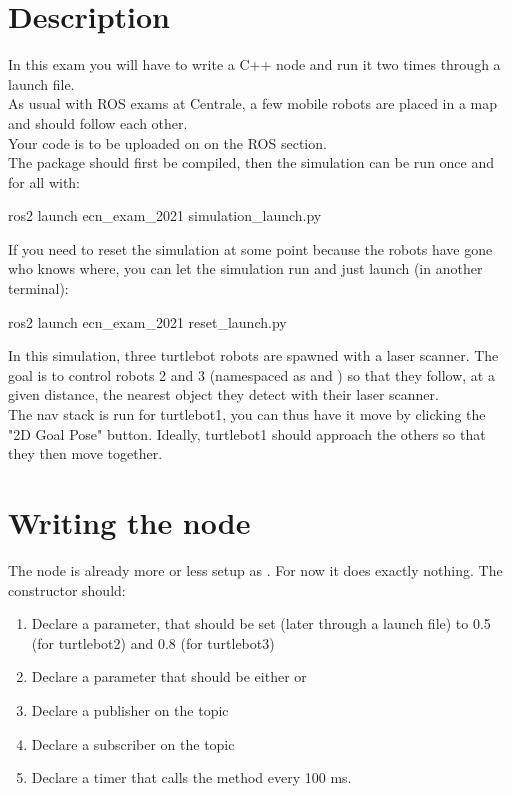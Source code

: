 \documentclass{ecnreport}
\begin{document}


\section{Description}

In this exam you will have to write a C++ node and run it two times through a launch file.\\
As usual with ROS exams at Centrale, a few mobile robots are placed in a map and should follow each other.\\

Your code is to be uploaded on  on the ROS section.\\

The package should first be compiled, then the simulation can be run once and for all with:
\begin{bashcodelarge}
 ros2 launch ecn_exam_2021 simulation_launch.py
\end{bashcodelarge}
If you need to reset the simulation at some point because the robots have gone who knows where, you can let the simulation run and just launch (in another terminal):
\begin{bashcodelarge}
 ros2 launch ecn_exam_2021 reset_launch.py
\end{bashcodelarge}

In this simulation, three turtlebot robots are spawned with a laser scanner. The goal is to control robots 2 and 3 (namespaced as  and ) so that they follow, at a given distance, the nearest object they detect with their laser scanner. \\

The nav stack is run for turtlebot1, you can thus have it move by clicking the "2D Goal Pose" button. Ideally, turtlebot1 should approach the others so that they then move together.

\section{Writing the node}

The node is already more or less setup as . For now it does exactly nothing. The constructor should:
\begin{enumerate}
 \item Declare a  parameter, that should be set (later through a launch file) to 0.5 (for turtlebot2) and 0.8 (for turtlebot3)
 \item Declare a  parameter that should be either  or 
 \item Declare a publisher on the topic 
 \item Declare a subscriber on the topic 
 \item Declare a timer that calls the  method every 100 ms.
\end{enumerate}
\end{document}
